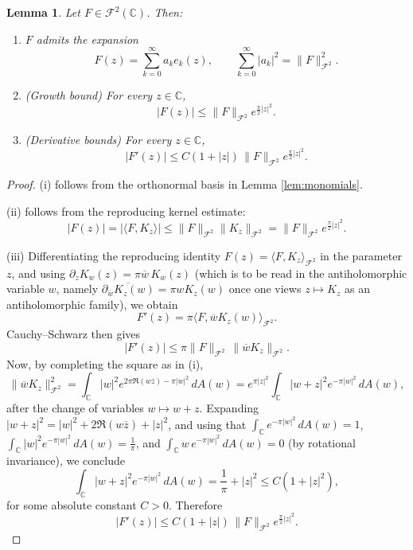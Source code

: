 \documentclass[a4paper,11pt,reqno]{amsart}
\numberwithin{equation}{section}
\theoremstyle{plain} %
\newtheorem{lemma}{Lemma}[section]
\theoremstyle{definition} %
\theoremstyle{remark}
\newcommand{\C}{\mathbb{C}}
\begin{document}
\begin{lemma}\label{lem:growth}
Let $F \in \mathcal{F}^2(\mathbb{C})$. Then:
\begin{enumerate}
\item[(i)] $F$ admits the expansion
\[
F(z) = \sum_{k=0}^\infty a_k e_k(z),
\qquad \sum_{k=0}^\infty |a_k|^2 = \|F\|_{\mathcal{F}^2}^2.
\]

\item[(ii)] (Growth bound) For every $z \in \mathbb{C}$,
\[
|F(z)| \le \|F\|_{\mathcal{F}^2} e^{\frac{\pi}{2}|z|^2}.
\]

\item[(iii)] (Derivative bounds) For every $z \in \mathbb{C}$,
\[
|F'(z)| \le C(1+|z|)\, \|F\|_{\mathcal{F}^2} e^{\frac{\pi}{2}|z|^2}.
\]
\end{enumerate}
\end{lemma}

\begin{proof}
(i) follows from the orthonormal basis in Lemma \ref{lem:monomials}.

(ii) follows from the reproducing kernel estimate:
\[
|F(z)| = |\langle F, K_z \rangle|
\le \|F\|_{\mathcal{F}^2} \|K_z\|_{\mathcal{F}^2}
= \|F\|_{\mathcal{F}^2} e^{\frac{\pi}{2}|z|^2}.
\]

(iii) Differentiating the reproducing identity
\(F(z)=\langle F,K_z\rangle_{\mathcal F^2}\) in the parameter \(z\), and using
\(\partial_z K_w(z) =\pi \overline{w}\,K_w(z)\) (which is to be read in the
antiholomorphic variable \(w\), namely \(\overline{\partial_{\overline w}K_z(w)}=\pi w K_z(w)\)
once one views \(z\mapsto K_z\) as an antiholomorphic family), we obtain
\[
F'(z)=\pi \langle F,\overline{w}K_z(w)\rangle_{\mathcal F^2}.
\]
Cauchy--Schwarz then gives
\[
|F'(z)|
\le
\pi \|F\|_{\mathcal F^2}\,\|\overline{w}K_z\|_{\mathcal F^2}.
\]
Now, by completing the square as in (i),
\[
\|\overline{w}K_z\|_{\mathcal F^2}^2
=
\int_{\C} |w|^2 e^{2\pi\Re(w\overline z)-\pi |w|^2}\,dA(w)
=
e^{\pi |z|^2}\int_{\C} |w+z|^2 e^{-\pi |w|^2}\,dA(w),
\]
after the change of variables \(w\mapsto w+z\). Expanding
\(|w+z|^2=|w|^2+2\Re(w\overline z)+|z|^2\), and using that
\(\int_\C e^{-\pi |w|^2}\,dA(w)=1\),
\(\int_\C |w|^2 e^{-\pi |w|^2}\,dA(w)=\frac{1}{\pi}\), and
\(\int_\C w\,e^{-\pi |w|^2}\,dA(w)=0\) (by rotational invariance), we conclude
\[
\int_{\C} |w+z|^2 e^{-\pi |w|^2}\,dA(w)
=
\frac{1}{\pi}+|z|^2
\le
C(1+|z|^2),
\]
for some absolute constant \(C>0\). Therefore
\[
|F'(z)| \le C(1+|z|)\,\|F\|_{\mathcal F^2}e^{\frac{\pi}{2}|z|^2}.
\]
\end{proof}
\end{document}
